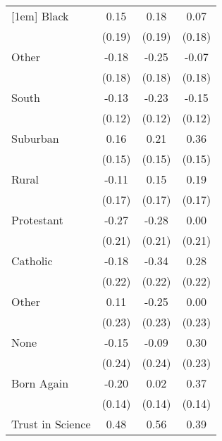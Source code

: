 \begin{table}[htbp]
\begin{tabular}{l*{3}{c}}
[1em]
Black               &        0.15        &        0.18        &        0.07        \\
                    &      (0.19)        &      (0.19)        &      (0.18)        \\
[1em]
Other               &       -0.18        &       -0.25        &       -0.07        \\
                    &      (0.18)        &      (0.18)        &      (0.18)        \\
[1em]
South               &       -0.13        &       -0.23        &       -0.15        \\
                    &      (0.12)        &      (0.12)        &      (0.12)        \\
[1em]
Suburban            &        0.16        &        0.21        &        0.36\sym{*} \\
                    &      (0.15)        &      (0.15)        &      (0.15)        \\
[1em]
Rural               &       -0.11        &        0.15        &        0.19        \\
                    &      (0.17)        &      (0.17)        &      (0.17)        \\
[1em]
Protestant          &       -0.27        &       -0.28        &        0.00        \\
                    &      (0.21)        &      (0.21)        &      (0.21)        \\
[1em]
Catholic            &       -0.18        &       -0.34        &        0.28        \\
                    &      (0.22)        &      (0.22)        &      (0.22)        \\
[1em]
Other               &        0.11        &       -0.25        &        0.00        \\
                    &      (0.23)        &      (0.23)        &      (0.23)        \\
[1em]
None                &       -0.15        &       -0.09        &        0.30        \\
                    &      (0.24)        &      (0.24)        &      (0.23)        \\
[1em]
Born Again          &       -0.20        &        0.02        &        0.37\sym{**}\\
                    &      (0.14)        &      (0.14)        &      (0.14)        \\
[1em]
Trust in Science    &        0.48\sym{**}&        0.56\sym{**}&        0.39\sym{**}\\

\end{tabular}
\end{table}
